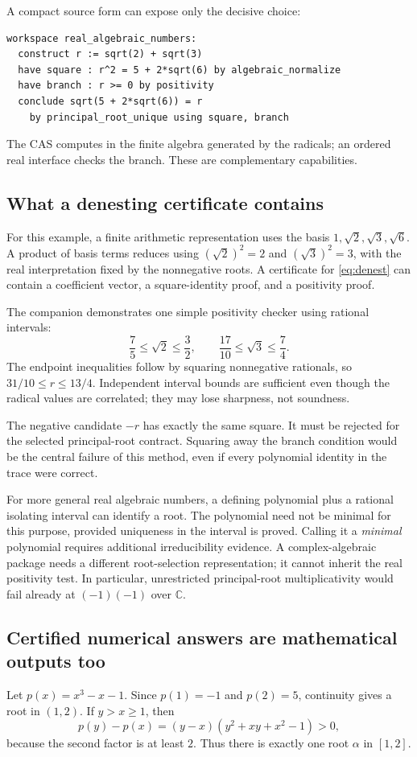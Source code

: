 \documentclass[11pt,letterpaper]{article}
\newcommand{\C}{\mathbb C}
\theoremstyle{definition}
\theoremstyle{remark}
\begin{document}
A compact source form can expose only the decisive choice:
\begin{lstlisting}
workspace real_algebraic_numbers:
  construct r := sqrt(2) + sqrt(3)
  have square : r^2 = 5 + 2*sqrt(6) by algebraic_normalize
  have branch : r >= 0 by positivity
  conclude sqrt(5 + 2*sqrt(6)) = r
    by principal_root_unique using square, branch
\end{lstlisting}
The CAS computes in the finite algebra generated by the radicals; an ordered
real interface checks the branch. These are complementary capabilities.

\subsection{What a denesting certificate contains}
For this example, a finite arithmetic representation uses the basis
$1,\sqrt2,\sqrt3,\sqrt6$. A product of basis terms reduces using
$(\sqrt2)^2=2$ and $(\sqrt3)^2=3$, with the real interpretation fixed by the
nonnegative roots. A certificate for \eqref{eq:denest} can contain a coefficient
vector, a square-identity proof, and a positivity proof.

The companion demonstrates one simple positivity checker using rational
intervals:
\[
 \frac75\leq\sqrt2\leq\frac32,\qquad
 \frac{17}{10}\leq\sqrt3\leq\frac74.
\]
The endpoint inequalities follow by squaring nonnegative rationals, so
$31/10\leq r\leq13/4$. Independent interval bounds are sufficient even though
the radical values are correlated; they may lose sharpness, not soundness.

The negative candidate $-r$ has exactly the same square. It must be rejected
for the selected principal-root contract. Squaring away the branch condition
would be the central failure of this method, even if every polynomial identity
in the trace were correct.

For more general real algebraic numbers, a defining polynomial plus a rational
isolating interval can identify a root. The polynomial need not be minimal for
this purpose, provided uniqueness in the interval is proved. Calling it a
\emph{minimal} polynomial requires additional irreducibility evidence. A
complex-algebraic package needs a different root-selection representation;
it cannot inherit the real positivity test. In particular, unrestricted
principal-root multiplicativity would fail already at $(-1)(-1)$ over $\C$.

\subsection{Certified numerical answers are mathematical outputs too}
Let $p(x)=x^3-x-1$. Since $p(1)=-1$ and $p(2)=5$, continuity gives a root in
$(1,2)$. If $y>x\geq1$, then
\[
 p(y)-p(x)=(y-x)(y^2+xy+x^2-1)>0,
\]
because the second factor is at least $2$. Thus there is exactly one root
$\alpha$ in $[1,2]$.
\end{document}
